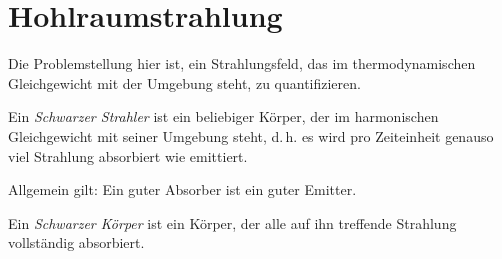 
\section{Hohlraumstrahlung}
Die Problemstellung hier ist, ein Strahlungsfeld, das im
thermodynamischen Gleichgewicht mit der Umgebung steht, zu
quantifizieren.

Ein \emph{Schwarzer Strahler} ist ein
beliebiger Körper, der im harmonischen Gleichgewicht mit seiner
Umgebung steht, d.\,h. es wird pro Zeiteinheit genauso viel Strahlung
absorbiert wie emittiert.

Allgemein gilt: Ein guter Absorber ist ein guter Emitter.

Ein \emph{Schwarzer Körper} ist ein Körper,
der alle auf ihn treffende Strahlung vollständig absorbiert.

